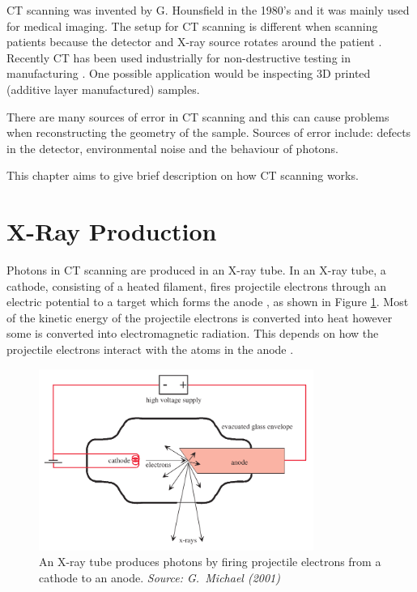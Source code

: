 \documentclass[12pt]{report}
\begin{document}
CT scanning was invented by G. Hounsfield \cite{hounsfield1980computed} in the 1980's and it was mainly used for medical imaging. The setup for CT scanning is different when scanning patients because the detector and X-ray source rotates around the patient \cite{cantatore2011introduction}. Recently CT has been used industrially for non-destructive testing in manufacturing \cite{cantatore2011introduction}. One possible application would be inspecting 3D printed (additive layer manufactured) samples.

There are many sources of error in CT scanning \cite{cantatore2011introduction} and this can cause problems when reconstructing the geometry of the sample. Sources of error include: defects in the detector, environmental noise and the behaviour of photons.

This chapter aims to give brief description on how CT scanning works.

\section{X-Ray Production}
Photons in CT scanning are produced in an X-ray tube. In an X-ray tube, a cathode, consisting of a heated filament, fires projectile electrons through an electric potential to a target which forms the anode \cite{michael2001x}, as shown in Figure \ref{fig:x_ray_tube}. Most of the kinetic energy of the projectile electrons is converted into heat however some is converted into electromagnetic radiation. This depends on how the projectile electrons interact with the atoms in the anode \cite{cantatore2011introduction}.

\begin{figure}
\centering
\includegraphics[width=0.8\textwidth]{figures/x_ray_tube.png}
\caption{An X-ray tube produces photons by firing projectile electrons from a cathode to an anode. \emph{Source: G.~Michael (2001) \cite{michael2001x}}}
\label{fig:x_ray_tube}
\end{figure}
\end{document}
